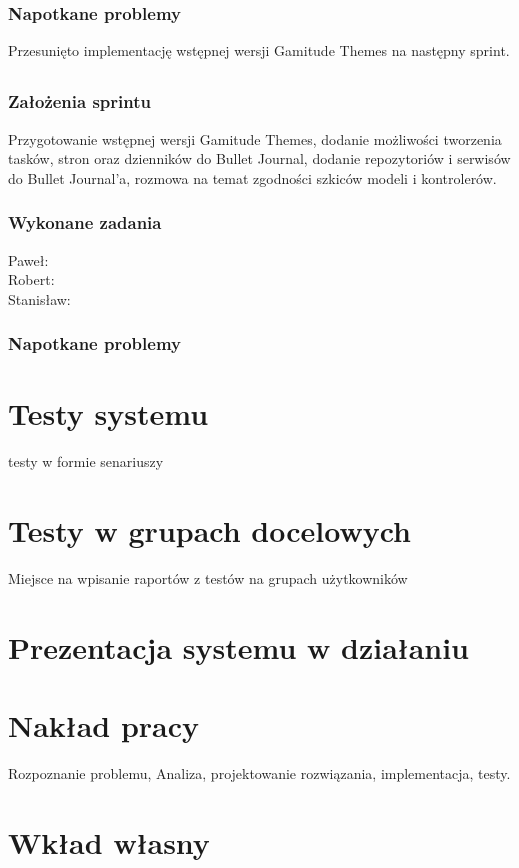 \documentclass[a4paper,11pt]{report}
\begin{document}
\subsection {Napotkane problemy}
Przesunięto implementację wstępnej wersji Gamitude Themes na następny sprint.

\section {}
\subsection {Założenia sprintu}
Przygotowanie wstępnej wersji Gamitude Themes, dodanie możliwości tworzenia tasków, stron oraz dzienników do Bullet Journal, dodanie repozytoriów i serwisów do Bullet Journal'a, rozmowa na temat zgodności szkiców modeli i kontrolerów.
\subsection {Wykonane zadania}
Paweł: 
\\Robert: 
\\Stanisław: 
\subsection {Napotkane problemy}


\chapter {Testy systemu}
testy w formie senariuszy
\chapter {Testy w grupach docelowych}
Miejsce na wpisanie raportów z testów na grupach użytkowników

\chapter{Prezentacja systemu w działaniu}
\chapter{Nakład pracy}
Rozpoznanie problemu, Analiza, projektowanie rozwiązania, implementacja, testy.

\chapter {Wkład własny}
\end{document}
